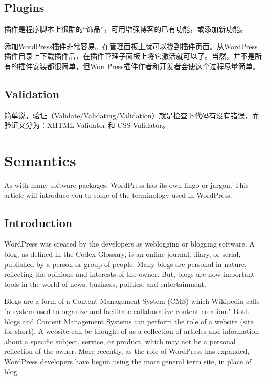\section{Plugins}


插件是程序脚本上很酷的“饰品”，可用增强博客的已有功能，或添加新功能。

添加WordPress插件非常容易。在管理面板上就可以找到插件页面。从WordPress插件目录上下载插件后，在插件管理子面板上将它激活就可以了。当然，并不是所有的插件安装都很简单，但WordPress插件作者和开发者会使这个过程尽量简单。


\section{Validation}

简单说，验证（Validate/Validating/Validation）就是检查下代码有没有错误，而验证又分为：XHTML Validator 和 CSS Validator。





\chapter{Semantics}

As with many software packages, WordPress has its own lingo or jargon. This article will introduce you to some of the terminology used in WordPress.

\section{Introduction}

WordPress was created by the developers as weblogging or blogging software. A blog, as defined in the Codex Glossary, is an online journal, diary, or serial, published by a person or group of people. Many blogs are personal in nature, reflecting the opinions and interests of the owner. But, blogs are now important tools in the world of news, business, politics, and entertainment.

Blogs are a form of a Content Management System (CMS) which Wikipedia calls "a system used to organize and facilitate collaborative content creation." Both blogs and Content Management Systems can perform the role of a website (site for short). A website can be thought of as a collection of articles and information about a specific subject, service, or product, which may not be a personal reflection of the owner. More recently, as the role of WordPress has expanded, WordPress developers have begun using the more general term site, in place of blog.

